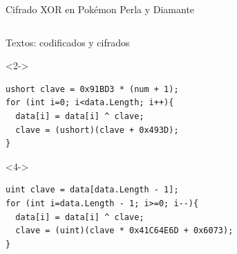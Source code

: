 \begin{frame}[fragile]{Cifrado XOR en Pokémon Perla y Diamante}
\begin{columns}
\begin{column}{0.75\textwidth}
    Textos: codificados y cifrados
    \begin{uncoverenv}<2->\begin{lstlisting}
ushort clave = 0x91BD3 * (num + 1);
for (int i=0; i<data.Length; i++){
  data[i] = data[i] ^ clave;
  clave = (ushort)(clave + 0x493D);
}
    \end{lstlisting}\end{uncoverenv}

    \begin{uncoverenv}<4->\begin{lstlisting}
uint clave = data[data.Length - 1];
for (int i=data.Length - 1; i>=0; i--){
  data[i] = data[i] ^ clave;
  clave = (uint)(clave * 0x41C64E6D + 0x6073);
}
    \end{lstlisting}\end{uncoverenv}
\end{column}

\begin{column}{0.25\textwidth}
    \vfill
\end{column}
\end{columns}
\end{frame}


